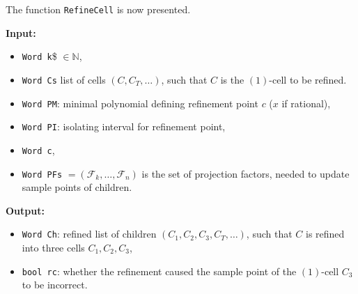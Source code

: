 \documentclass[
]{book}
\providecommand{\tightlist}{%
  \setlength{\itemsep}{0pt}\setlength{\parskip}{0pt}}
\theoremstyle{definition}
\theoremstyle{definition}
\theoremstyle{definition}
\theoremstyle{definition}
\theoremstyle{remark}
\begin{document}
The function \texttt{RefineCell} is now presented.

\textbf{Input:}

\begin{itemize}
\tightlist
\item
  \texttt{Word\ k}\$ \(\in \mathbb{N}\),
\item
  \texttt{Word\ Cs} list of cells \((C,C_T,\ldots)\), such that \(C\) is the \((1)\)-cell to be refined.
\item
  \texttt{Word\ PM}: minimal polynomial defining refinement point \(c\) (\(x\) if rational),
\item
  \texttt{Word\ PI}: isolating interval for refinement point,
\item
  \texttt{Word\ c},
\item
  \texttt{Word\ PFs} \(= (\mathcal{F}_{k},\ldots,\mathcal{F}_n)\) is the set of projection factors, needed to update sample points of children.
\end{itemize}

\textbf{Output:}

\begin{itemize}
\tightlist
\item
  \texttt{Word\ Ch\textquotesingle{}}: refined list of children \((C_1,C_2,C_3,C_T,\ldots)\), such that \(C\) is refined into three cells \(C_1,C_2,C_3\),
\item
  \texttt{bool\ rc}: whether the refinement caused the sample point of the \((1)\)-cell \(C_3\) to be incorrect.
\end{itemize}
\end{document}
